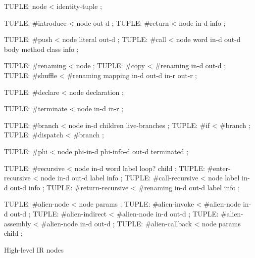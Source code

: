 \centering

  \begin{factorcode}
    TUPLE: node < identity-tuple ;

    TUPLE: #introduce < node out-d ;
    TUPLE: #return < node in-d info ;

    TUPLE: #push < node literal out-d ;
    TUPLE: #call < node word in-d out-d body method class info ;

    TUPLE: #renaming < node ;
    TUPLE: #copy < #renaming in-d out-d ;
    TUPLE: #shuffle < #renaming mapping in-d out-d in-r out-r ;

    TUPLE: #declare < node declaration ;

    TUPLE: #terminate < node in-d in-r ;

    TUPLE: #branch < node in-d children live-branches ;
    TUPLE: #if < #branch ;
    TUPLE: #dispatch < #branch ;

    TUPLE: #phi < node phi-in-d phi-info-d out-d terminated ;

    TUPLE: #recursive < node in-d word label loop? child ;
    TUPLE: #enter-recursive < node in-d out-d label info ;
    TUPLE: #call-recursive < node label in-d out-d info ;
    TUPLE: #return-recursive < #renaming in-d out-d label info ;

    TUPLE: #alien-node < node params ;
    TUPLE: #alien-invoke < #alien-node in-d out-d ;
    TUPLE: #alien-indirect < #alien-node in-d out-d ;
    TUPLE: #alien-assembly < #alien-node in-d out-d ;
    TUPLE: #alien-callback < node params child ;
  \end{factorcode}

\caption{High-level IR nodes}
